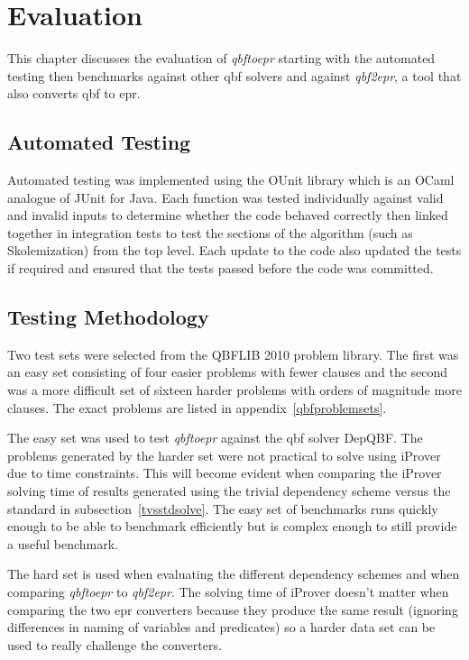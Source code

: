 \chapter{Evaluation} \label{evaluation}
This chapter discusses the evaluation of \textit{qbftoepr} starting with the automated testing then benchmarks against other \gls{qbf} solvers and against \textit{qbf2epr}, a tool that also converts \gls{qbf} to \gls{epr}.

\section{Automated Testing}
Automated testing was implemented using the OUnit library which is an OCaml analogue of JUnit for Java. Each function was tested individually against valid and invalid inputs to determine whether the code behaved correctly then linked together in integration tests to test the sections of the algorithm (such as Skolemization) from the top level. Each update to the code also updated the tests if required and ensured that the tests passed before the code was committed.

\section{Testing Methodology}
Two test sets were selected from the QBFLIB 2010 problem library. The first was an easy set consisting of four easier problems with fewer clauses and the second was a more difficult set of sixteen harder problems with orders of magnitude more clauses. The exact problems are listed in appendix~\ref{qbfproblemsets}.

The easy set was used to test \textit{qbftoepr} against the \gls{qbf} solver DepQBF. The problems generated by the harder set were not practical to solve using iProver due to time constraints. This will become evident when comparing the iProver solving time of results generated using the trivial dependency scheme versus the standard in subsection~\ref{tvsstdsolve}. The easy set of benchmarks runs quickly enough to be able to benchmark efficiently but is complex enough to still provide a useful benchmark.

The hard set is used when evaluating the different dependency schemes and when comparing \textit{qbftoepr} to \textit{qbf2epr}. The solving time of iProver doesn't matter when comparing the two \gls{epr} converters because they produce the same result (ignoring differences in naming of variables and predicates) so a harder data set can be used to really challenge the converters.

